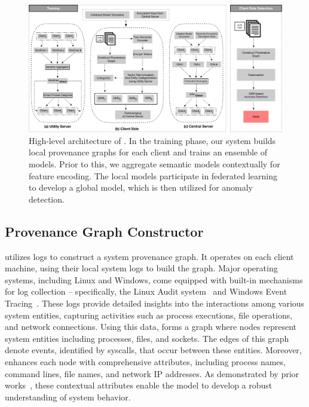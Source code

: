 
\begin{figure}[t!]
  \centering
  \includegraphics[width=\textwidth]{fig/archv3.pdf}
  \caption{High-level architecture of \Sys. In the training phase, our system builds local provenance graphs for each client and trains an ensemble of \gnnshort models. Prior to this, we aggregate semantic models contextually for feature encoding. The local \gnnshort models participate in federated learning to develop a global \gnnshort model, which is then utilized for anomaly detection.}
  \vspace{-3ex}
  \label{fig:arch}
\end{figure}

\subsection{Provenance Graph Constructor} 
\label{provconstruct}
\Sys utilizes \logs logs to construct a system provenance graph. It operates on each client machine, using their local system logs to build the graph. Major operating systems, including Linux and Windows, come equipped with built-in mechanisms for log collection -- specifically, the Linux Audit system~\cite{linuxaudit} and Windows Event Tracing~\cite{windowsaudit}. These logs provide detailed insights into the interactions among various system entities, capturing activities such as process executions, file operations, and network connections. Using this data, \Sys forms a graph where nodes represent system entities including processes, files, and sockets. The edges of this graph denote events, identified by syscalls, that occur between these entities. Moreover, \Sys enhances each node with comprehensive attributes, including process names, command lines, file names, and network IP addresses. As demonstrated by prior works~\cite{flash2024,cheng2023kairos}, these contextual attributes enable the model to develop a robust understanding of system behavior.

